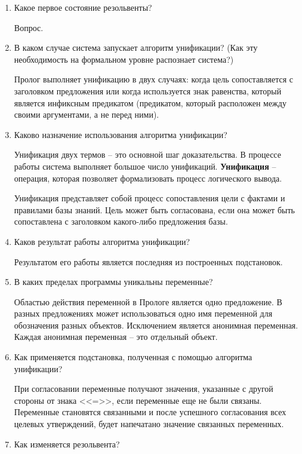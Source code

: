 \documentclass[a4paper,14pt]{extreport} %
\begin{document}
\begin{enumerate} 

\item Какое первое состояние резольвенты?

Вопрос. 

\item В каком случае система запускает алгоритм унификации? (Как эту необходимость на формальном уровне распознает система?)

Пролог выполняет унификацию в двух случаях: когда цель сопоставляется с заголовком предложения или когда используется знак равенства, который является инфиксным предикатом (предикатом, который расположен между своими аргументами, а не перед ними).

\item Каково назначение использования алгоритма унификации? 

Унификация двух термов -- это основной шаг доказательства. В процессе работы система выполняет большое число унификаций.
\textbf{Унификация} -- операция, которая позволяет формализовать процесс логического вывода. 

Унификация представляет собой процесс сопоставления цели с фактами и правилами базы знаний. Цель может быть согласована, если она может быть сопоставлена с заголовком какого-либо предложения базы.

\item Каков результат работы алгоритма унификации? 

Результатом его работы является последняя из построенных подстановок. 

\item В каких пределах программы уникальны переменные? 

Областью действия переменной в Прологе является одно предложение. В разных предложениях может использоваться одно имя переменной для обозначения разных объектов. Исключением является анонимная переменная. Каждая анонимная переменная -- это отдельный объект.

\item Как применяется подстановка, полученная с помощью алгоритма унификации?

При согласовании переменные получают значения, указанные с другой стороны от знака <<=>>, если переменные еще не были связаны. Переменные становятся связанными и после успешного согласования всех целевых утверждений, будет напечатано значение связанных переменных.

\item Как изменяется резольвента?


\end{enumerate}
\end{document}
